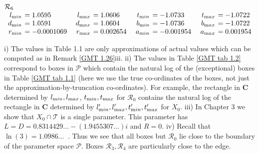 \begin{table}
\begin{small}
$$\begin{array}{rlrlrlrl}
\noalign{\noindent  ${\mathcal R}_6$}
\noalign{\vskip2pt}
l_{\textrm min} &\hskip-6pt =  1.0595&\enspace    l_{\textrm max} &\hskip-6pt =  1.0606&\enspace   
t_{\textrm min} &\hskip-6pt =  -1.0733&\enspace    t_{\textrm max} &\hskip-6pt =  -1.0722\\
d_{\textrm min} &\hskip-6pt =  1.0591&  d_{\textrm max}
&\hskip-6pt =  1.0604&   b_{\textrm min} &\hskip-6pt =  -1.0736&  b_{\textrm max} &\hskip-6pt =  -1.0722\\
r_{\textrm min} &\hskip-6pt =  -0.0001069& 
r_{\textrm max} &\hskip-6pt =  0.002654&   a_{\textrm min} &\hskip-6pt =  -0.001954&  a_{\textrm max} &\hskip-6pt =  0.001954\end{array}$$
\end{small}
\end{table}

\begin{remarks}\label{GMT 1.30}
i)  The values in Table 1.1 are only 
	approximations of actual values which can be computed as in Remark \ref{GMT 1.26}iii.
	ii)  The values in Table \ref{GMT tab 1.2} correspond to boxes in ${\mathcal P}$ which contain the natural log of the (exceptional) boxes in Table \ref{GMT tab 1.1} (here we use the true co-ordinates of the boxes, not just the approximation-by-truncation co-ordinates).  
For example,
 the rectangle in ${\mathbf C}$ determined by $l_{\textrm min}, l_{\textrm max}$,
$t_{\textrm min}, t_{\textrm max}$ for ${\mathcal R}_0$ contains the natural log of the rectangle in ${\mathbf C}$ determined by $l'_{\textrm min},
l'_{\textrm max}, t'_{\textrm min}, t'_{\textrm max}$ for $X_0$.  
iii)  In Chapter 3 we show that $X_0 \cap {\mathcal T}$ is a single parameter.  %
This parameter has $L=D=0.8314429\ldots  -  (1.9455307\ldots) i $   and $R=0.$
iv)  Recall that $\ln(3)=1.0986\ldots\ $  .  Thus we see that all boxes
but ${\mathcal R}_0$ lie
close to the boundary of the parameter space ${\mathcal P}$.  
Boxes ${\mathcal R}_3, {\mathcal R}_4$ are particularly close to the edge.
\end{remarks}

